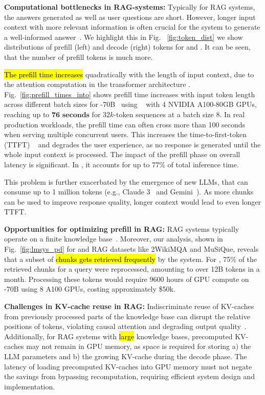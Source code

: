 \textbf{Computational bottlenecks in RAG-systems:}
Typically for RAG systems, the answers generated as well as user questions are short. However, longer input context with more relevant information is often crucial for the system to generate a well-informed answer~\cite{cuconasu2024power}. 
We highlight this in Fig. ~\ref{fig:token_dist} we show distributions of prefill (left) and decode (right) tokens for \X and \Y. It can be seen, that the number of prefill tokens is much more. 


\hl{The prefill time increases} quadratically with the length of input context, due to the attention computation in the transformer architecture \cite{vaswani2017attention}. 
{Fig.~\ref{fig:prefill_times_into}} shows prefill time increases with input token length across different batch sizes for -70B~\cite{touvron2023llama} using \vllm~\cite{kwon2023efficient} with 4 NVIDIA A100-80GB GPUs, reaching up to \textbf{$\textbf{76 seconds}$} for $32k$-token sequences at a batch size $8$.
In real production workloads, the prefill time can often cross more than 100 seconds when serving multiple concurrent users. 
This increases the time-to-first-token (TTFT) ~\cite{agrawal2024taming} and degrades the user experience, as no response is generated until the whole input context is processed.
The impact of the prefill phase on overall latency is significant. In \X, it accounts for up to 77\% of total inference time. 

This problem is further exacerbated by the emergence of new LLMs, that can consume up to 1 million tokens (e.g., Claude 3~\cite{anthropic2024claude} and Gemini~\cite{reid2024gemini}). 
As more chunks can be used to improve response quality, longer context would lead to even longer TTFT.


\textbf{Opportunities for optimizing prefill in RAG:}
%
RAG systems typically operate on a finite knowledge base~\cite{lewis2020retrieval}. Moreover, our analysis, shown in Fig.~\ref{fig:lmsys_pd} for \X and RAG datasets like 2WikiMQA and MuSiQue, reveals that a subset of \hl{chunks gets retrieved frequently} by the system. For \X, 75\% of the retrieved chunks for a query were reprocessed, amounting to over 12B tokens in a month. Processing these tokens would require 9600 hours of GPU compute on -70B using 8 A100 GPUs, costing approximately \$50k.


\textbf{Challenges in KV-cache reuse in RAG:}
Indiscriminate reuse of KV-caches from previously processed parts of the knowledge base can disrupt the relative positions of tokens, violating causal attention and degrading output quality~\cite{vaswani2017attention}. 
Additionally, for RAG systems with \hl{large} knowledge bases, precomputed KV-caches may not remain in GPU memory, as space is required for storing a) the LLM parameters and b) the growing KV-cache during the decode phase. The latency of loading precomputed KV-caches into GPU memory must not negate the savings from bypassing recomputation, requiring efficient system design and implementation.

